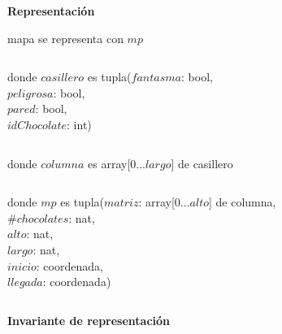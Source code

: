 \documentclass{book}
\begin{document}
    \newpage

    \textbf{Representación}

    mapa se representa con $mp$

    $ $

    donde $casillero$ es tupla($fantasma$: bool, \\
        \text{}\qquad\quad $peligrosa$: bool, \\
        \text{}\qquad\quad $pared$: bool, \\
        \text{}\qquad\quad $idChocolate$: int)

    $ $

    donde $columna$ es array[0...$largo$] de casillero

    $ $

    donde $mp$ es tupla($matriz$: array[0...$alto$] de columna, \\
        \text{}\qquad\quad \#$chocolates$: nat, \\
        \text{}\qquad\quad $alto$: nat, \\
        \text{}\qquad\quad $largo$: nat, \\
        \text{}\qquad\quad $inicio$: coordenada, \\
        \text{}\qquad\quad $llegada$: coordenada)

    $ $

    \textbf{Invariante de representación}

\end{document}
